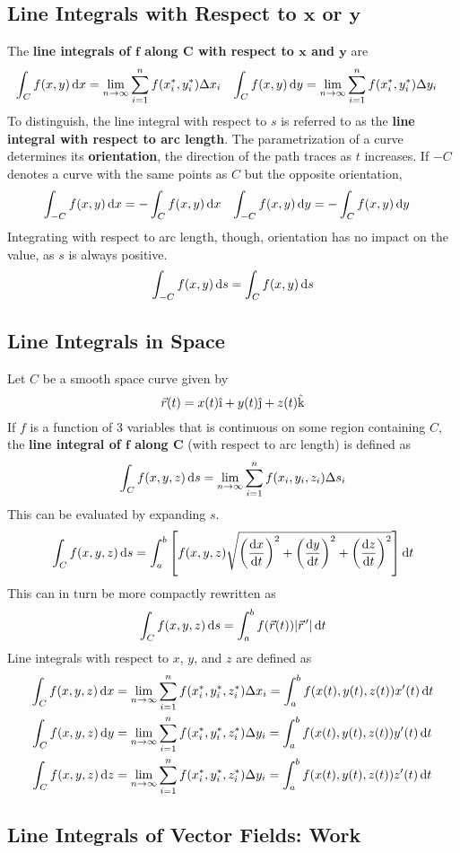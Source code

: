 \documentclass[./Calculus \Roman{3}.tex]{subfiles}
\begin{document}
		\subsection*{Line Integrals with Respect to $\bm{x}$ or $\bm{y}$}
			The \textbf{line integrals of $\bm{f}$ along $\bm{C}$ with respect to $\bm{x}$ and $\bm{y}$} are 
				\begin{align*}
					\int_C f(x, y)\,\mathrm{d} x &= \lim_{n \to \infty}\sum_{i = 1}^n f(x_i^*, y_i^*)\Delta x_i &
							\int_C f(x, y)\,\mathrm{d} y &= \lim_{n \to \infty}\sum_{i = 1}^n f(x_i^*, y_i^*)\Delta y_i
				\end{align*}
				To distinguish, the line integral with respect to $s$ is referred to as the \textbf{line integral with respect to arc length}.
			The parametrization of a curve determines its \textbf{orientation}, the direction of the path traces as $t$ increases.
			If $-C$ denotes a curve with the same points as $C$ but the opposite orientation,
				\begin{align*}
					\int_{-C} f(x, y)\,\mathrm{d} x &= -\int_C f(x, y)\,\mathrm{d} x &
							\int_{-C} f(x, y)\,\mathrm{d} y &= -\int_C f(x, y)\,\mathrm{d} y
				\end{align*}
				Integrating with respect to arc length, though, orientation has no impact on the value, as $s$ is always positive.
				\[\int_{-C} f(x, y)\,\mathrm{d} s = \int_C f(x, y)\,\mathrm{d} s\]
		\subsection*{Line Integrals in Space}
			Let $C$ be a smooth space curve given by
				\[\vec{r}(t) = x(t)\vi + y(t)\vj + z(t)\vk\]
				If $f$ is a function of 3 variables that is continuous on some region containing $C$, the \textbf{line integral of $\bm{f}$ along C} (with respect to arc length) is defined as
					\[\int_C f(x, y, z)\,\mathrm{d} s = \lim_{n \to \infty}\sum_{i = 1}^n f(x_i, y_i, z_i)\Delta s_i\]
				This can be evaluated by expanding $s$.
				\[\int_C f(x, y, z)\,\mathrm{d} s = \int_a^b\left[f(x, y, z)\sqrt{\left(\frac{\mathrm{d} x}{\mathrm{d} t}\right)^2 + \left(\frac{\mathrm{d} y}{\mathrm{d} t}\right)^2 + \left(\frac{\mathrm{d} z}{\mathrm{d} t}\right)^2}\right]\mathrm{d} t\]
				This can in turn be more compactly rewritten as
				\[\int_C f(x, y, z)\,\mathrm{d} s = \int_a^b f(\vec{r}(t))|\vec{r}\hspace{0.5mm}'|\,\mathrm{d} t\]
			Line integrals with respect to $x$, $y$, and $z$ are defined as
				\begin{align*}
					\int_C f(x, y, z)\,\mathrm{d} x &= \lim_{n \to \infty}\sum_{i = 1}^n f(x_i^*, y_i^*, z_i^*)\Delta x_i
							= \int_a^b f(x(t), y(t), z(t))x'(t)\,\mathrm{d} t \\
					\int_C f(x, y, z)\,\mathrm{d} y &= \lim_{n \to \infty}\sum_{i = 1}^n f(x_i^*, y_i^*, z_i^*)\Delta y_i
							= \int_a^b f(x(t), y(t), z(t))y'(t)\,\mathrm{d} t \\
					\int_C f(x, y, z)\,\mathrm{d} z &= \lim_{n \to \infty}\sum_{i = 1}^n f(x_i^*, y_i^*, z_i^*)\Delta y_i
							= \int_a^b f(x(t), y(t), z(t))z'(t)\,\mathrm{d} t
				\end{align*}
		\subsection*{Line Integrals of Vector Fields: Work}
\end{document}
